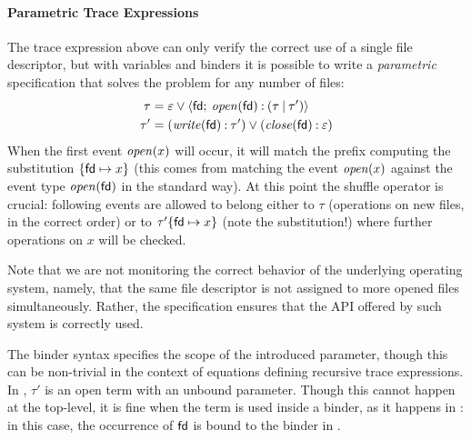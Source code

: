 
\paragraph{Parametric Trace Expressions}
The trace expression above can only verify the correct use of a single file descriptor, but with variables and binders \cite{AnconaFM17} it is possible to write a \emph{parametric} specification that solves the problem for any number of files:
\begin{align}
\label{eq:files1}
\tau &= \varepsilon \mathbin{\vee} {\langle}\mathsf{fd};\:{\mathit{open}(\mathsf{fd}) \mathbin{:} (\tau \mathbin{|} \tau')}{\rangle}\\
\label{eq:files2}
\tau' &= (\mathit{write}(\mathsf{fd}) \mathbin{:} \tau') \mathbin{\vee} (\mathit{close}(\mathsf{fd}) \mathbin{:} \varepsilon)
\end{align}
When the first event \(\mathit{open}(x)\) will occur, it will match the prefix computing the substitution \(\{\mathsf{fd}\mapsto x\}\) (this comes from matching the event \(\mathit{open}(x)\) against the event type \(\mathit{open}(\mathsf{fd})\) in the standard way).
At this point the shuffle operator is crucial:
following events are allowed to belong either to \(\tau\) (operations on new files, in the correct order) or to \(\tau'\{\mathsf{fd}\mapsto x\}\) (note the substitution!) where further operations on \(x\) will be checked.

Note that we are not monitoring the correct behavior of the underlying operating system, namely, that the same file descriptor is not assigned to more opened files simultaneously.
Rather, the specification ensures that the API offered by such system is correctly used.

The binder syntax specifies the scope of the introduced parameter, though this can be non-trivial in the context of equations defining recursive trace expressions.
In , \(\tau'\) is an open term with an unbound parameter.
Though this cannot happen at the top-level, it is fine when the term is used inside a binder, as it happens in : in this case, the occurrence of \(\mathsf{fd}\) is bound to the binder in .

